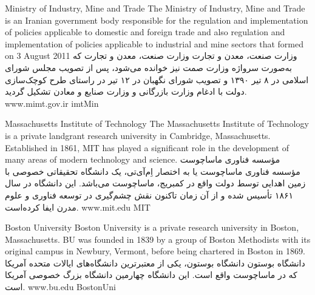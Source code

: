 
\instituteC
{Ministry of Industry, Mine and Trade}
{The Ministry of Industry, Mine and Trade is an Iranian government body responsible for the regulation and implementation of
policies applicable to domestic and foreign trade and also regulation and implementation of policies applicable to industrial
and mine sectors that formed on 3 August 2011}
{}
{وزارت صنعت، معدن و تجارت}
{وزارت صنعت، معدن و تجارت که به‌صورت سرواژه وزارت صمت نیز خوانده می‌شود،
پس از تصویب مجلس شورای اسلامی در ۸ تیر ۱۳۹۰ و تصویب شورای نگهبان در ۱۲ تیر
در راستای طرح کوچک‌سازی دولت با ادغام وزارت بازرگانی و وزارت صنایع و معادن تشکیل گردید.}
{}
{www.mimt.gov.ir}
{imtMin}

\instituteC
{Massachusetts Institute of Technology}
{The Massachusetts Institute of Technology is a private landgrant research university in Cambridge, Massachusetts.
Established in 1861, MIT has played a significant role in the development of many areas of modern technology and science.}
{}
{مؤسسه فناوری ماساچوست}
{مؤسسه فناوری ماساچوست یا به اختصار اِم‌آی‌تی، یک دانشگاه تحقیقاتی خصوصی با زمین اهدایی توسط دولت واقع در کمبریج، ماساچوست می‌باشد.
این دانشگاه در سال ۱۸۶۱ تأسیس شده و از آن زمان تاکنون نقش چشم‌گیری در توسعه فناوری و علوم مدرن ایفا کرده‌است.}
{}
{www.mit.edu}
{MIT}

\instituteC
{Boston University}
{Boston University is a private research university in Boston, Massachusetts.
BU was founded in 1839 by a group of Boston Methodists with its original campus
in Newbury, Vermont, before being chartered in Boston in 1869.}
{}
{دانشگاه بوستون}
{دانشگاه بوستون، یکی از معتبرترین دانشگاه‌های ایالات متحده آمریکا که در ماساچوست واقع است.
این دانشگاه چهارمین دانشگاه بزرگ خصوصی آمریکا است.}
{}
{www.bu.edu}
{BostonUni}
